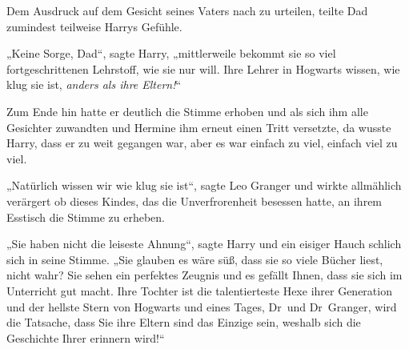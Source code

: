 Dem Ausdruck auf dem Gesicht seines Vaters nach zu urteilen, teilte Dad zumindest teilweise Harrys Gefühle.

„Keine Sorge, Dad“, sagte Harry, „mittlerweile bekommt sie so viel fortgeschrittenen Lehrstoff, wie sie nur will. Ihre Lehrer in Hogwarts wissen, wie klug sie ist, \emph{anders als ihre Eltern!}“

Zum Ende hin hatte er deutlich die Stimme erhoben und als sich ihm alle Gesichter zuwandten und Hermine ihm erneut einen Tritt versetzte, da wusste Harry, dass er zu weit gegangen war, aber es war einfach zu viel, einfach viel zu viel.

„Natürlich wissen wir wie klug sie ist“, sagte Leo Granger und wirkte allmählich verärgert ob dieses Kindes, das die Unverfrorenheit besessen hatte, an ihrem Esstisch die Stimme zu erheben.

„Sie haben nicht die leiseste Ahnung“, sagte Harry und ein eisiger Hauch schlich sich in seine Stimme.
„Sie glauben es wäre süß, dass sie so viele Bücher liest, nicht wahr? Sie sehen ein perfektes Zeugnis und es gefällt Ihnen, dass sie sich im Unterricht gut macht. Ihre Tochter ist die talentierteste Hexe ihrer Generation und der hellste Stern von Hogwarts und eines Tages, Dr~und Dr~Granger, wird die Tatsache, dass Sie ihre Eltern sind das Einzige sein, weshalb sich die Geschichte Ihrer erinnern wird!“

